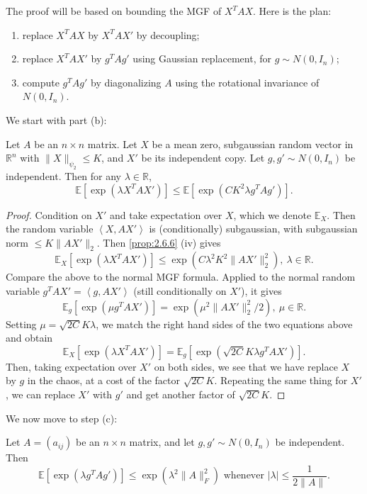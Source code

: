 The proof will be based on bounding the MGF of $X^TAX$. Here is the plan:
\begin{enumerate}
	\item replace $X^TAX$ by $X^TAX'$ by decoupling;
	\item replace $X^TAX'$ by $g^T Ag'$ using Gaussian replacement, for $g \sim N(0, I_n)$;
	\item compute $g^TAg'$ by diagonalizing $A$ using the rotational invariance of $N(0, I_n)$.
\end{enumerate}

We start with part (b):
\begin{lemma}
\label{lem:6.2.3}
Let $A$ be an $n \times n$ matrix. Let $X$ be a mean zero, subgaussian random vector in $\mathbb{R}^n$ with 
$\lVert X \rVert_{\psi_2} \leq K$, and $X'$ be its independent copy. Let $g, g' \sim N(0, I_n)$ be independent. 
Then for any $\lambda \in \mathbb{R}$, 
\[ \mathbb{E}\left[ \exp{(\lambda X^TAX')} \right] \leq \mathbb{E}\left[ \exp{(CK^2 \lambda g^TAg')} \right]. \]
\end{lemma}

\begin{proof}
Condition on $X'$ and take expectation over $X$, which we denote $\mathbb{E}_X$. Then the random variable 
$\left\langle X, AX' \right\rangle$ is (conditionally) subgaussian, with subgaussian norm $\leq K 
\lVert AX' \rVert_{2}$. Then \cref{prop:2.6.6} (iv) gives 
\[ \mathbb{E}_X\left[ \exp{(\lambda X^TAX')} \right] \leq \exp{(C \lambda^2 K^2 \lVert AX' \rVert_{2}^2)}, 
\ \lambda \in \mathbb{R}. \]
Compare the above to the normal MGF formula. Applied to the normal random variable $g^TAX' = \left\langle 
g, AX' \right\rangle$ (still conditionally on $X'$), it gives 
\[ \mathbb{E}_g\left[ \exp{(\mu g^T AX')} \right] = \exp{(\mu^2 \lVert AX' \rVert_{2}^2 / 2)}, \ \mu 
\in \mathbb{R}. \]
Setting $\mu = \sqrt{2C}K \lambda$, we match the right hand sides of the two equations above and obtain 
\[ \mathbb{E}_X\left[ \exp{(\lambda X^TAX')} \right] = \mathbb{E}_g\left[ \exp{(\sqrt{2C}K \lambda g^TAX')} 
\right]. \]
Then, taking expectation over $X'$ on both sides, we see that we have replace $X$ by $g$ in the chaos, at a cost 
of the factor $\sqrt{2C}K$. Repeating the same thing for $X'$, we can replace $X'$ with $g'$ and get another 
factor of $\sqrt{2C}K$.
\end{proof}

We now move to step (c):
\begin{lemma}
\label{lem:6.2.4} Let $A = (a_{ij})$ be an $n \times n$ matrix, and let $g, g' \sim N(0, I_n)$ be independent. 
Then 
\[ \mathbb{E}\left[ \exp{(\lambda g^TAg')} \right] \leq \exp{(\lambda^2 \lVert A \rVert_{F}^2)} 
\text{ whenever } |\lambda| \leq \frac{1}{2 \lVert A \rVert_{}}. \]
\end{lemma}

